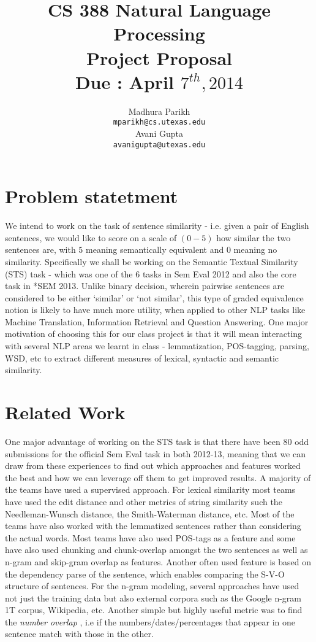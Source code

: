 \documentclass[11pt]{article}
\title{{\small CS 388 Natural Language Processing} \\ Project Proposal \\ {\small Due : April $7^{th}, 2014$}}
\author{Madhura Parikh \\
  {\tt mparikh@cs.utexas.edu} \\\And
  Avani Gupta\\
  {\tt avanigupta@utexas.edu} \\}
\date{}
\begin{document}
\maketitle
\section{Problem statetment}
We intend to work on the task of sentence similarity - i.e. given a pair of English sentences, we would like to score on a scale of $(0-5)$ how similar the two sentences are, with $5$ meaning semantically equivalent and $0$ meaning no similarity.  Specifically we shall be working on the Semantic Textual Similarity (STS) task - which was one of the $6$ tasks in Sem Eval 2012 and also the core task in *SEM 2013. Unlike binary decision, wherein pairwise sentences are considered to be either `similar' or `not similar',  this type of graded equivalence notion is likely to have much more utility, when applied to other NLP tasks like Machine Translation, Information Retrieval and Question Answering. One major motivation of choosing this for our class project is that it will mean interacting with several NLP areas we learnt in class - lemmatization, POS-tagging, parsing, WSD, etc to extract different measures of lexical, syntactic and semantic similarity. 
\section{Related Work}
One major advantage of working on the STS task is that there have been $80$ odd submissions for the official Sem Eval task in both 2012-13, meaning that we can draw from these experiences to find out which approaches and features worked the best and how we can leverage off them to get improved results.  A majority of the teams have used a supervised approach. For lexical similarity most teams have used the edit distance and other metrics of string similarity such the Needleman-Wunsch distance, the Smith-Waterman distance, etc. Most of the teams have also worked with the lemmatized sentences rather than considering the actual words. Most teams have also used POS-tags as a feature and some have also used chunking and chunk-overlap amongst the two sentences as well as n-gram and skip-gram overlap as features. Another often used feature is based on the dependency parse of the sentence, which enables comparing the S-V-O structure of sentences. For the n-gram modeling, several approaches have used not just the training data but also external corpora such as the Google n-gram 1T corpus, Wikipedia, etc. Another simple but  highly useful metric was to find the \emph{number overlap} , i.e if the numbers/dates/percentages that appear in one sentence match with those in the other. 
\end{document}
